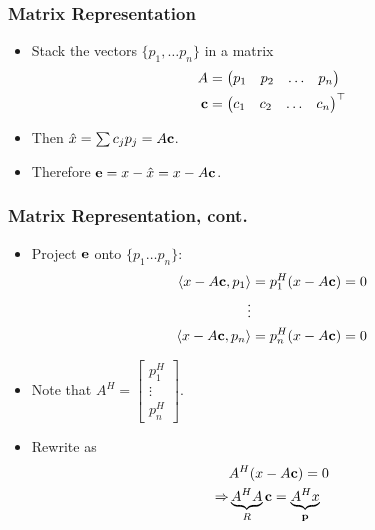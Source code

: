 \documentclass{beamer}
\begin{document}
\begin{frame}\frametitle{Matrix Representation}
	\begin{itemize}
	\item 	Stack the vectors $\{ p_1, \ldots p_n\}$ in a matrix
	\begin{align*}
	A &= \begin{pmatrix}p_1 & p_2 & \ldots & p_n \end{pmatrix} \\
 	\mathbf{c} &= \begin{pmatrix} c_1 & c_2 & \ldots & c_n \end{pmatrix}^\top	
	\end{align*}
	
	\item Then $\hat{x} = \sum c_j p_j = A \mathbf{c}$.
	\item Therefore $\mathbf{e} = x - \hat{x} = x - A\mathbf{c}$.
	\end{itemize}
\end{frame}

\begin{frame}\frametitle{Matrix Representation, cont.}
	\begin{itemize}
	\item Project $\mathbf{e}$ onto $\{p_1 \ldots p_n\}$:
		\begin{align*}
		\left< x-A\mathbf{c}, p_1\right> &= p_1^H (x-A\mathbf{c}) = 0\\
		\vdots\\
		\left< x-A\mathbf{c}, p_n\right> &= p_n^H (x - A \mathbf{c}) = 0
		\end{align*}
		
	\item Note that $A^H = \left[ \begin{array}{c} p_1^H \\ \vdots \\
	p_n^H \end{array} \right]$.
	
	\item Rewrite as
	\begin{align*}
	& A^H(x-A\mathbf{c}) = 0 \\
	\Rightarrow & \underbrace{A^HA}_{R}\mathbf{c} = \underbrace{A^Hx}_{\mathbf{p}}
	\end{align*}
	\end{itemize}
\end{frame}
\end{document}
